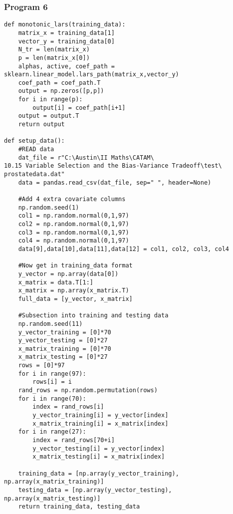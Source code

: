 \documentclass{article}
\begin{document}
\vspace{-0.5cm}
\subsubsection{Program 6}
\vspace{-0.5cm}
\label{subsec:Program 6} 

\begin{lstlisting}
def monotonic_lars(training_data):
    matrix_x = training_data[1]
    vector_y = training_data[0]
    N_tr = len(matrix_x)
    p = len(matrix_x[0])
    alphas, active, coef_path =  
sklearn.linear_model.lars_path(matrix_x,vector_y)
    coef_path = coef_path.T
    output = np.zeros([p,p])
    for i in range(p):
        output[i] = coef_path[i+1]
    output = output.T
    return output

def setup_data():
    #READ data
    dat_file = r"C:\Austin\II Maths\CATAM\
10.15 Variable Selection and the Bias-Variance Tradeoff\test\
prostatedata.dat"
    data = pandas.read_csv(dat_file, sep=" ", header=None)

    #Add 4 extra covariate columns
    np.random.seed(1)
    col1 = np.random.normal(0,1,97)
    col2 = np.random.normal(0,1,97)
    col3 = np.random.normal(0,1,97)
    col4 = np.random.normal(0,1,97)
    data[9],data[10],data[11],data[12] = col1, col2, col3, col4

    #Now get in training_data format
    y_vector = np.array(data[0])
    x_matrix = data.T[1:]
    x_matrix = np.array(x_matrix.T)
    full_data = [y_vector, x_matrix]

    #Subsection into training and testing data
    np.random.seed(11)
    y_vector_training = [0]*70
    y_vector_testing = [0]*27
    x_matrix_training = [0]*70
    x_matrix_testing = [0]*27
    rows = [0]*97
    for i in range(97):
        rows[i] = i
    rand_rows = np.random.permutation(rows)
    for i in range(70):
        index = rand_rows[i]
        y_vector_training[i] = y_vector[index]
        x_matrix_training[i] = x_matrix[index]
    for i in range(27):
        index = rand_rows[70+i]
        y_vector_testing[i] = y_vector[index]
        x_matrix_testing[i] = x_matrix[index]

    training_data = [np.array(y_vector_training), np.array(x_matrix_training)]
    testing_data = [np.array(y_vector_testing), np.array(x_matrix_testing)]
    return training_data, testing_data
\end{lstlisting}
\end{document}
